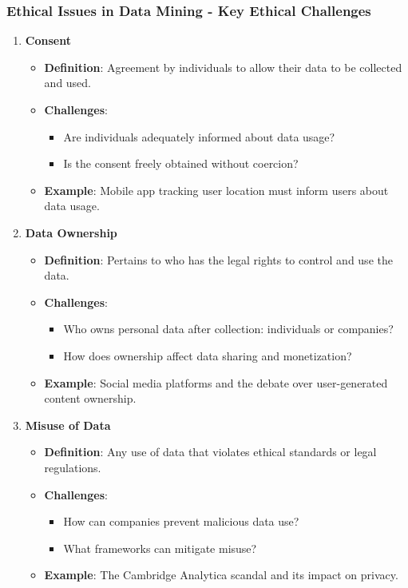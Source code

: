 \documentclass[aspectratio=169]{beamer}
\begin{document}
\begin{frame}[fragile]
  \frametitle{Ethical Issues in Data Mining - Key Ethical Challenges}
  \begin{enumerate}
    \item \textbf{Consent}
      \begin{itemize}
        \item \textbf{Definition}: Agreement by individuals to allow their data to be collected and used.
        \item \textbf{Challenges}:
          \begin{itemize}
            \item Are individuals adequately informed about data usage?
            \item Is the consent freely obtained without coercion?
          \end{itemize}
        \item \textbf{Example}: Mobile app tracking user location must inform users about data usage.
      \end{itemize}
    
    \item \textbf{Data Ownership}
      \begin{itemize}
        \item \textbf{Definition}: Pertains to who has the legal rights to control and use the data.
        \item \textbf{Challenges}:
          \begin{itemize}
            \item Who owns personal data after collection: individuals or companies?
            \item How does ownership affect data sharing and monetization?
          \end{itemize}
        \item \textbf{Example}: Social media platforms and the debate over user-generated content ownership.
      \end{itemize}
    
    \item \textbf{Misuse of Data}
      \begin{itemize}
        \item \textbf{Definition}: Any use of data that violates ethical standards or legal regulations.
        \item \textbf{Challenges}:
          \begin{itemize}
            \item How can companies prevent malicious data use?
            \item What frameworks can mitigate misuse?
          \end{itemize}
        \item \textbf{Example}: The Cambridge Analytica scandal and its impact on privacy.
      \end{itemize}
  \end{enumerate}
\end{frame}
\end{document}
